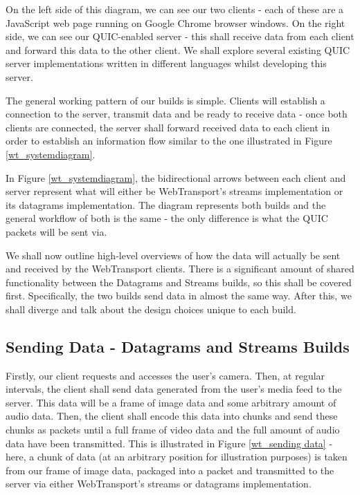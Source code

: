 On the left side of this diagram, we can see our two clients - each of these are a JavaScript web page running on Google Chrome browser windows. On the right side, we can see our QUIC-enabled server - this shall receive data from each client and forward this data to the other client. We shall explore several existing QUIC server implementations written in different languages whilst developing this server.

The general working pattern of our builds is simple. Clients will establish a connection to the server, transmit data and be ready to receive data - once both clients are connected, the server shall forward received data to each client in order to establish an information flow similar to the one illustrated in Figure \ref{wt_systemdiagram}. 

In Figure \ref{wt_systemdiagram}, the bidirectional arrows between each client and server represent what will either be WebTransport's streams implementation or its datagrams implementation. The diagram represents both builds and the general workflow of both is the same - the only difference is what the QUIC packets will be sent via.

We shall now outline high-level overviews of how the data will actually be sent and received by the WebTransport clients. There is a significant amount of shared functionality between the Datagrams and Streams builds, so this shall be covered first. Specifically, the two builds send data in almost the same way. After this, we shall diverge and talk about the design choices unique to each build.

\subsection{Sending Data - Datagrams and Streams Builds}

Firstly, our client requests and accesses the user's camera. Then, at regular intervals, the client shall send data generated from the user's media feed to the server. This data will be a frame of image data and some arbitrary amount of audio data. Then, the client shall encode this data into chunks and send these chunks as packets until a full frame of video data and the full amount of audio data have been transmitted. This is illustrated in Figure \ref{wt_sending data} - here, a chunk of data (at an arbitrary position for illustration purposes) is taken from our frame of image data, packaged into a packet and transmitted to the server via either WebTransport's streams or datagrams implementation.

